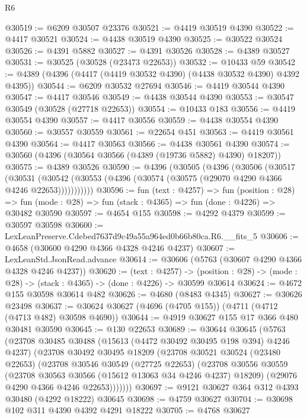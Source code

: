 \begin{lexlean}{R6}
\begin{coremodule}
@30519 := @6209 @30507 @23376
@30521 := @4419 @30519 @4390
@30522 := @4417 @30521
@30524 := @4438 @30519 @4390
@30525 := @30522 @30524
@30526 := @4391 @5882
@30527 := @4391 @30526
@30528 := @4389 @30527
@30531 := @30525 (@30528 (@23473 @22653))
@30532 := @10433 @59
@30542 := @4389 (@4396 (@4417 (@4419 @30532 @4390) (@4438 @30532 @4390) @4392 @4395))
@30544 := @6209 @30532 @27694
@30546 := @4419 @30544 @4390
@30547 := @4417 @30546
@30549 := @4438 @30544 @4390
@30553 := @30547 @30549 (@30528 (@27718 @22653))
@30554 := @10433 @183
@30556 := @4419 @30554 @4390
@30557 := @4417 @30556
@30559 := @4438 @30554 @4390
@30560 := @30557 @30559
@30561 := @22654 @451
@30563 := @4419 @30561 @4390
@30564 := @4417 @30563
@30566 := @4438 @30561 @4390
@30574 := @30560 (@4396 (@30564 @30566 (@4389 (@19736 @5882) @4390) @18207))
@30575 := @4389 @30526
@30590 := @4396
    (@30505
      (@4396
        (@30506
          (@30517
            (@30531
              (@30542 (@30553 (@4396 (@30574 (@30575 (@29070 @4290 @4366 @4246 @22653)))))))))))
@30596 := fun (text : @4257) =>
  fun (position : @28) =>
  fun (mode : @28) => fun (stack : @4365) => fun (done : @4226) => @30482 @30590
@30597 := @4654 @155
@30598 := @4292 @4379
@30599 := @30597 @30598
@30600 := LexLeanPreserve.Cdebed7637d9c49a55a964ed0b66b80ca.R6.__fits_5
@30606 := @4658 (@30600 @4290 @4366 @4328 @4246 @4237)
@30607 := LexLeanStd.JsonRead.advance
@30614 := @30606 (@5763 (@30607 @4290 @4366 @4328 @4246 @4237))
@30620 := (text : @4257) ->
  (position : @28) -> (mode : @28) -> (stack : @4365) -> (done : @4226) -> @30599 @30614
@30624 := @4672 @155 @30598 @30614 @482
@30626 := @4680 (@8483 @4345)
@30627 := @30626 @23498
@30637 := @30624 @30627 (@4696 (@4705 @155)) (@4711 (@4712 (@4713 @482) @30598 @4690))
@30644 := @4919 @30627 @155 @17 @366 @480 @30481 @30590
@30645 := @130 @22653
@30689 := @30644
    @30645
    (@5763
      (@23708
        @30485
        @30488
        (@15613 (@4472 @30492 @30495 @198 @394) @4246 @4237)
        (@23708
          @30492
          @30495
          @18209
          (@23708
            @30521
            @30524
            (@23480 @22653)
            (@23708
              @30546
              @30549
              (@27725 @22653)
              (@23708
                @30556
                @30559
                (@23708 @30563 @30566 (@15612 @13063 @34 @4246 @4237) @18209)
                (@29076 @4290 @4366 @4246 @22653)))))))
@30697 := @9121 @30627 @364 @312 @4393 @30480 (@4292 @18222) @30645
@30698 := @4759 @30627
@30704 := @30698 @102 @311 @4390 @4392 @4291 @18222
@30705 := @4768 @30627

\end{coremodule}
\end{lexlean}
